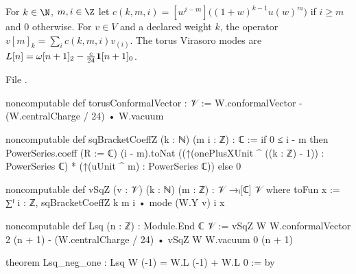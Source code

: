\begin{definition}\label{l15:def:sqmode}
For $k\in\N$, $m,i\in\Z$ let $c(k,m,i)=[w^{i-m}]\bigl((1+w)^{k-1}u(w)^m\bigr)$ if $i\ge m$ and $0$ otherwise. For
$v\in V$ and a declared weight $k$, the operator $v[m]_k=\sum_i c(k,m,i)v_{(i)}$. The torus Virasoro modes are
$L[n]=\omega[n+1]_2-\frac{c}{24}\mathbf{1}[n+1]_0$.
\end{definition}
\noindent File .
\begin{leancode}
noncomputable def torusConformalVector : 𝒱 :=
  W.conformalVector - (W.centralCharge / 24) • W.vacuum

noncomputable def sqBracketCoeffZ (k : ℕ) (m i : ℤ) : ℂ :=
  if 0 ≤ i - m then
    PowerSeries.coeff (R := ℂ) (i - m).toNat
      ((↑(onePlusXUnit ^ ((k : ℤ) - 1)) : PowerSeries ℂ) * (↑(uUnit ^ m) : PowerSeries ℂ))
  else 0

noncomputable def vSqZ (v : 𝒱) (k : ℕ) (m : ℤ) : 𝒱 →ₗ[ℂ] 𝒱 where
  toFun x := ∑ᶠ i : ℤ, sqBracketCoeffZ k m i • mode (W.Y v) i x

noncomputable def Lsq (n : ℤ) : Module.End ℂ 𝒱 :=
  vSqZ W W.conformalVector 2 (n + 1)
    - (W.centralCharge / 24) • vSqZ W W.vacuum 0 (n + 1)

theorem Lsq_neg_one : Lsq W (-1) = W.L (-1) + W.L 0 := by
\end{leancode}

